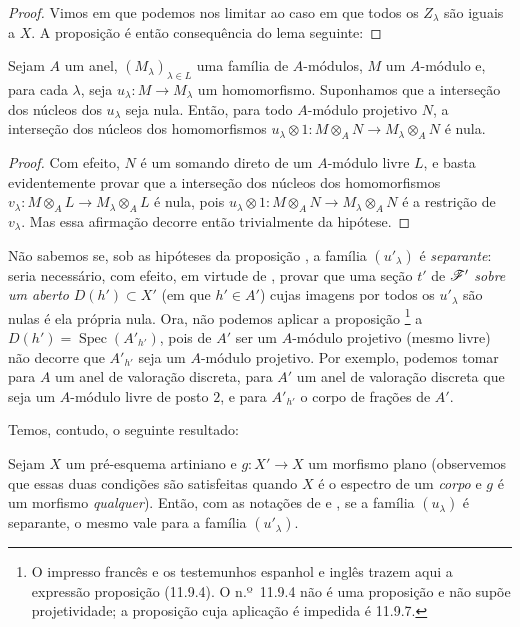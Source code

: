 \begin{proof}
Vimos em 
que podemos nos limitar
ao caso em que todos
os $Z_\lambda$ são
iguais a $X$. A proposição
é então consequência
do lema seguinte:
\end{proof}

\begin{lemma}[11.9.7.1]
\label{IV.11.9.7.1}
Sejam $A$ um anel,
$(M_\lambda)_{\lambda\in L}$
uma família de
$A$-módulos, $M$ um
$A$-módulo e, para cada
$\lambda$, seja
$u_\lambda:
M\to M_\lambda$ um
homomorfismo.
Suponhamos que a
interseção dos núcleos
dos $u_\lambda$ seja
nula. Então, para todo
$A$-módulo projetivo
$N$, a interseção dos
núcleos dos
homomorfismos
$u_\lambda\otimes 1:
M\otimes_A N\to
M_\lambda\otimes_A N$
é nula.
\end{lemma}

\begin{proof}
Com efeito, $N$ é um
somando direto de um
$A$-módulo livre $L$,
e basta evidentemente
provar que a interseção
dos núcleos dos
homomorfismos
$v_\lambda:
M\otimes_A L\to
M_\lambda\otimes_A L$
é nula, pois
$u_\lambda\otimes 1:
M\otimes_A N\to
M_\lambda\otimes_A N$
é a restrição de
$v_\lambda$. Mas essa
afirmação decorre então
trivialmente da hipótese.
\end{proof}

\begin{remark}[11.9.8]
\label{IV.11.9.8}
Não sabemos se, sob as
hipóteses da proposição
, a
família $(u'_\lambda)$
é \emph{separante}:
seria necessário, com
efeito, em virtude de
,
provar que uma seção
$t'$ de $\mathscr{F}'$
\emph{sobre um aberto}
$D(h')\subset X'$
(em que $h'\in A'$)
cujas imagens por todos
os $u'_\lambda$ são
nulas é ela própria
nula. Ora, não podemos
aplicar a proposição
\footnote{O
impresso francês e os
testemunhos espanhol e
inglês trazem aqui a
expressão proposição
(11.9.4). O n.º~11.9.4
não é uma proposição
e não supõe
projetividade; a
proposição cuja aplicação
é impedida é 11.9.7.}
a
$D(h')=
\operatorname{Spec}(A'_{h'})$,
pois de $A'$ ser um
$A$-módulo projetivo
(mesmo livre) não
decorre que
$A'_{h'}$ seja um
$A$-módulo projetivo.
Por exemplo, podemos
tomar para $A$ um anel
de valoração discreta,
para $A'$ um anel de
valoração discreta
que seja um $A$-módulo
livre de posto $2$,
e para $A'_{h'}$ o
corpo de frações de
$A'$.
\end{remark}

Temos, contudo, o
seguinte resultado:

\begin{corollary}[11.9.9]
\label{IV.11.9.9}
Sejam $X$ um pré-esquema
artiniano e $g:X'\to X$
um morfismo plano
(observemos que essas
duas condições são
satisfeitas quando $X$
é o espectro de um
\emph{corpo} e $g$ é
um morfismo
\emph{qualquer}).
Então, com as notações
de 
e ,
se a família
$(u_\lambda)$ é
separante, o mesmo
vale para a família
$(u'_\lambda)$.
\end{corollary}

